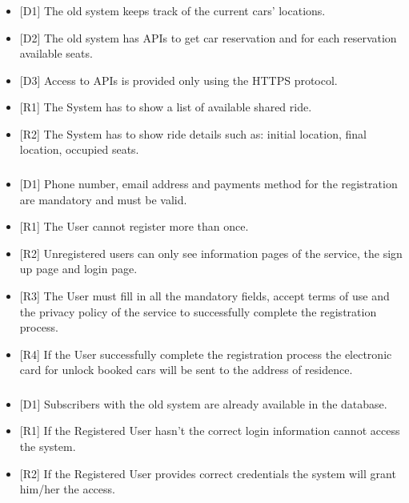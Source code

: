 \subsubsection{\gSystemShare}
\begin{itemize}
	\item {[}D1{]} The old system keeps track of the current cars' locations.
	\item {[}D2{]} The old system has APIs to get car reservation and for each reservation available seats.
	\item {[}D3{]} Access to APIs is provided only using the HTTPS protocol.
	\item {[}R1{]} The System has to show a list of available shared ride.
	\item {[}R2{]} The System has to show ride details such as: initial location, final location, occupied seats.
\end{itemize}
\subsubsection{\gVisitorSignUp}
\begin{itemize}
	\item {[}D1{]} Phone number, email address and payments method for the registration are mandatory and must be valid.
	\item {[}R1{]} The User cannot register more than once.
	\item {[}R2{]} Unregistered users can only see information pages of the service, the sign up page and login page.
	\item {[}R3{]} The User must fill in all the mandatory fields, accept terms of use and the privacy policy of the service to successfully complete the registration process.
	\item {[}R4{]} If the User successfully complete the registration process the electronic card for unlock booked cars will be sent to the address of residence.
\end{itemize}
\subsubsection{\gRegisteredLogin}
\begin{itemize}
	\item {[}D1{]} Subscribers with the old system are already available in the database.
	\item {[}R1{]} If the Registered User hasn’t the correct login information cannot access the system.
	\item {[}R2{]} If the Registered User provides correct credentials the system will grant him/her the access.
\end{itemize}
